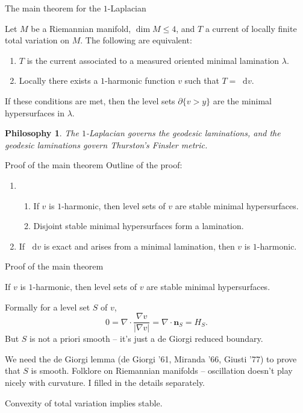 \documentclass[10pt]{beamer}
\newcommand*\dif{\mathop{}\!\mathrm{d}}
\newcommand{\normal}{\mathbf n}
\newtheorem{philosophy}{Philosophy}
\begin{document}
\begin{frame}{The main theorem for the $1$-Laplacian}
\begin{theorem}[AB]
Let $M$ be a Riemannian manifold, $\dim M \leq 4$, and $T$ a current of locally finite total variation on $M$. The following are equivalent:
\begin{enumerate}
\item $T$ is the current associated to a measured oriented minimal lamination $\lambda$.
\item Locally there exists a $1$-harmonic function $v$ such that $T = \dif v$.
\end{enumerate}
If these conditions are met, then the level sets $\partial \{v > y\}$ are the minimal hypersurfaces in $\lambda$.
\end{theorem}\pause

\begin{philosophy}
The $1$-Laplacian governs the geodesic laminations, and the geodesic laminations govern Thurston's Finsler metric.
\end{philosophy}
\end{frame}

\begin{frame}{Proof of the main theorem}
Outline of the proof:
\begin{enumerate}
\item \begin{enumerate}
\item If $v$ is $1$-harmonic, then level sets of $v$ are stable minimal hypersurfaces.
\item Disjoint stable minimal hypersurfaces form a lamination. \end{enumerate}
\item If $\dif v$ is exact and arises from a minimal lamination, then $v$ is $1$-harmonic.
\end{enumerate}
\end{frame}

\begin{frame}{Proof of the main theorem}
\begin{lemma}
    If $v$ is $1$-harmonic, then level sets of $v$ are stable minimal hypersurfaces.
\end{lemma}

Formally for a level set $S$ of $v$,
$$0 = \nabla \cdot \frac{\nabla v}{|\nabla v|} = \nabla \cdot \normal_S = H_S.$$
But $S$ is not a priori smooth -- it's just a de Giorgi reduced boundary.

We need the de Giorgi lemma (de Giorgi '61, Miranda '66, Giusti '77) to prove that $S$ is smooth.
Folklore on Riemannian manifolds -- oscillation doesn't play nicely with curvature.
I filled in the details separately.

Convexity of total variation implies stable.
\end{frame}
\end{document}
